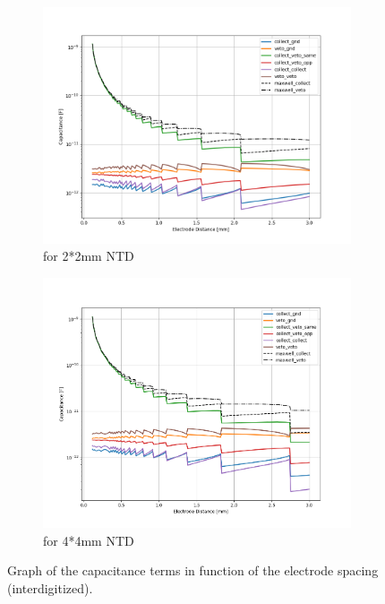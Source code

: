 \begin{figure}
\centering
\begin{subfigure}{.5\textwidth}
  \centering
  \includegraphics[width=\linewidth]{Figures/Electrodes/2x2_distance_sweep.png}
  \caption{for 2*2mm NTD}
  \label{fig:2D-simulation}
\end{subfigure}%
\begin{subfigure}{0.5\textwidth}
  \centering
  \includegraphics[width=\linewidth]{Figures/Electrodes/4x4_distance_sweep.png}
  \caption{for 4*4mm NTD}
  \label{fig:3D-simulation}
\end{subfigure}
\caption{Graph of the capacitance terms in function of the electrode spacing (interdigitized).}
\label{fig:2D-vs-3D}
\end{figure}

